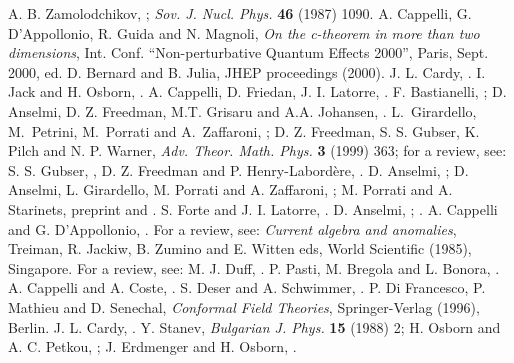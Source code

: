 \documentclass[11pt]{article}
\begin{document}
\begin{thebibliography}{99} 
   A. B. Zamolodchikov, ;
                {\it Sov. J. Nucl. Phys.} {\bf 46} (1987) 1090.
  A. Cappelli, G. D'Appollonio, R. Guida and N. Magnoli,
              {\it On the c-theorem in more than two dimensions},
               Int. Conf.
             ``Non-perturbative Quantum Effects 2000'', Paris, Sept. 2000,
           ed. D. Bernard and B. Julia, JHEP proceedings (2000).
 J. L. Cardy, .
    I. Jack and H. Osborn, .
   A. Cappelli, D. Friedan, J. I. Latorre, . 
    F. Bastianelli, ;
                D. Anselmi, D. Z. Freedman, M.T. Grisaru and A.A. Johansen,  
                . 
  L.~Girardello, M.~Petrini, M.~Porrati and A.~Zaffaroni, 
                ; D. Z. Freedman, S. S. Gubser, 
                K. Pilch and N. P. Warner, 
                {\it Adv. Theor. Math. Phys.} {\bf 3} (1999) 363; 
                for a review, see:
                S. S. Gubser, ,
                D. Z. Freedman and P. Henry-Labord\`ere, .
  D. Anselmi, ;
               D. Anselmi, L. Girardello, M. Porrati and A. Zaffaroni, 
               ; 
               M. Porrati and A. Starinets, preprint  and
                .
    S. Forte and J. I. Latorre, .  
   D. Anselmi, ; .
    A. Cappelli and G. D'Appollonio, .
For a review, see: {\it Current algebra and anomalies},
                Treiman, R. Jackiw, B. Zumino and E. Witten eds, 
                World Scientific (1985), Singapore.
  For a review, see: M. J. Duff, . 
  P. Pasti, M. Bregola and L. Bonora, .
   A. Cappelli and A. Coste, . 
    S. Deser and A. Schwimmer,  .  
 P. Di Francesco, P. Mathieu and D. Senechal,
                {\it Conformal Field Theories}, Springer-Verlag (1996),
               Berlin. 
 J. L. Cardy, .
  Y. Stanev, {\it Bulgarian J. Phys.} {\bf 15} (1988) 2;
              H. Osborn and A. C. Petkou, ;
              J. Erdmenger and H. Osborn, .

\end{thebibliography}
\end{document}
